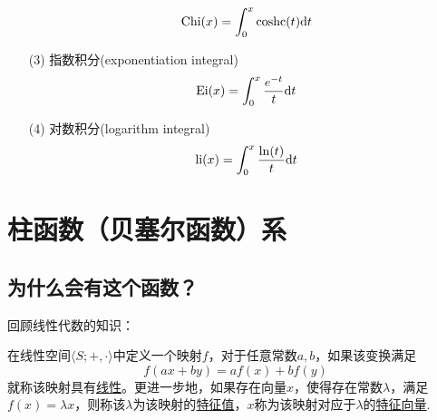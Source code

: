 \documentclass[main.tex]{subfiles}
\begin{document}
\begin{itemize}
\begin{equation*}
\begin{array}{ll}
            \displaystyle{{\rm Chi}(x) = \int_{0}^{x} {\rm coshc}(t) {\rm d}t}  \\
        \end{array}
    \end{equation*}
    \item[(3)] 指数积分(exponentiation integral)
    \[ {\rm Ei}(x) = \int_{0}^{x} \frac{e^{-t}}{t} {\rm d}t \]
    \item[(4)] 对数积分(logarithm integral)
    \[ {\rm li}(x) = \int_{0}^{x} \frac{\ln(t)}{t} {\rm d}t \]
\end{itemize}

\section{柱函数（贝塞尔函数）系}

\subsection{为什么会有这个函数？}

回顾线性代数的知识：
\begin{reference}
    在线性空间\(\langle S;+,\cdot \rangle\)中定义一个映射\(f\)，对于任意常数\(a,b\)，如果该变换满足
    \[f(ax+by)=af(x)+bf(y)\]
    就称该映射具有\uline{线性}。更进一步地，如果存在向量\(x\)，使得存在常数\(\lambda\)，满足\(f(x)=\lambda x\)，则称该\(\lambda\)为该映射的\uline{特征值}，\(x\)称为该映射对应于\(\lambda\)的\uline{特征向量}.
\end{reference}
\end{document}
